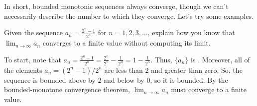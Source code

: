 \documentclass{ximera}
\begin{document}

In short, bounded monotonic sequences always converge, though we can't
necessarily describe the number to which they converge.  Let's try
some examples.

\begin{example}
  Given the sequence $a_n=\frac{2^n-1}{2^n}$ for $n=1,2,3,\dots$,
  explain how you know that $\lim_{n\to\infty} a_n$ converges to a
  finite value without computing its limit.
  \begin{explanation}
    To start, note that $a_n=\frac{2^n-1}{2^n} = \frac{2^n}{2^n} - \frac{1}{2^n} = 1 - \frac{1}{2^n} $.  Thus, $\{a_n\}$ is
    .
    Moreover, all of the elements $a_n = (2^n-1)/2^n$ are less than
    $2$  and greater than zero.   So, the sequence is bounded above by $2$ and below by $0$, so it is bounded.  By the bounded-monotone
    convergence theorem, $\lim_{n\to\infty} a_n$ must converge to a finite value.
  \end{explanation}
\end{example}
\end{document}
